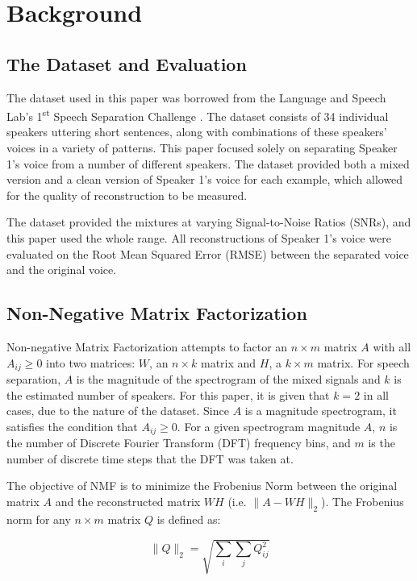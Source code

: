 \documentclass[12pt,chapterheads]{ucsd}
\begin{document}
\section{Background}
\subsection{The Dataset and Evaluation}
The dataset used in this paper was borrowed from the Language and Speech Lab's 1\textsuperscript{st} Speech Separation Challenge \cite{laslab}. The dataset consists of 34 individual speakers uttering short sentences, along with combinations of these speakers' voices in a variety of patterns. This paper focused solely on separating Speaker 1's voice from a number of different  speakers. The dataset provided both a mixed version and a clean version of Speaker 1's voice for each example, which allowed for the quality of reconstruction to be measured. 

The dataset provided the mixtures at varying Signal-to-Noise Ratios (SNRs), and this paper used the whole range. All reconstructions of Speaker 1's voice were evaluated on the Root Mean Squared Error (RMSE) between the separated voice and the original voice.

\subsection{Non-Negative Matrix Factorization}
Non-negative Matrix Factorization attempts to factor an $n \times m$ matrix $A$ with all $A_{ij} \geq 0$ into two matrices: $W$, an $n \times k$ matrix and $H$, a $k \times m$ matrix. For speech separation, $A$ is the magnitude of the spectrogram of the mixed signals and $k$ is the estimated number of speakers. For this paper, it is given that $k=2$ in all cases, due to the nature of the dataset. Since $A$ is a magnitude spectrogram, it satisfies the condition that $A_{ij} \geq 0$. For a given spectrogram magnitude $A$, $n$ is the number of Discrete Fourier Transform (DFT) frequency bins, and $m$ is the number of discrete time steps that the DFT was taken at.

The objective of NMF is to minimize the Frobenius Norm between the original matrix $A$ and the reconstructed matrix $WH$ (i.e. $\| A - WH\|_2$). The Frobenius norm for any $n \times m$ matrix $Q$ is defined as:

\begin{equation}
\| Q \|_2 = \sqrt{\sum\limits_{i} \sum\limits_{j} Q_{ij}^2}
\end{equation}
\end{document}
